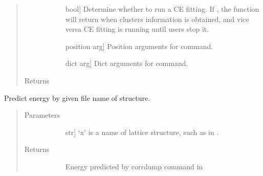 \documentclass[letterpaper,10pt,english]{sphinxmanual}
\begin{document}
\begin{fulllineitems}
\begin{fulllineitems}
\begin{quote}
\begin{description}
\begin{description}
\item[{}] \leavevmode{[}bool{]}
Determine whether to run a CE fitting. If , the function
will return when clusters information is obtained, and vice versa
CE fitting is running until users stop it.

\item[{}] \leavevmode{[}position arg{]}
Position arguments for  command.

\item[{}] \leavevmode{[}dict arg{]}
Dict arguments for  command.

\end{description}

\item[{Returns}] \leavevmode\begin{description}
\item[{}] \leavevmode
\end{description}

\end{description}\end{quote}

\end{fulllineitems}


\begin{fulllineitems}
\label{\detokenize{pygace:pygace.ce.CE.predict}}
Predict energy by given file name of structure.
\begin{quote}\begin{description}
\item[{Parameters}] \leavevmode\begin{description}
\item[{}] \leavevmode{[}str{]}
‘x’ is a name of lattice structure, such as  in .

\end{description}

\item[{Returns}] \leavevmode\begin{description}
\item[{}] \leavevmode
Energy predicted by corrdump command in 

\end{description}

\end{description}\end{quote}

\end{fulllineitems}


\end{fulllineitems}
\end{document}
